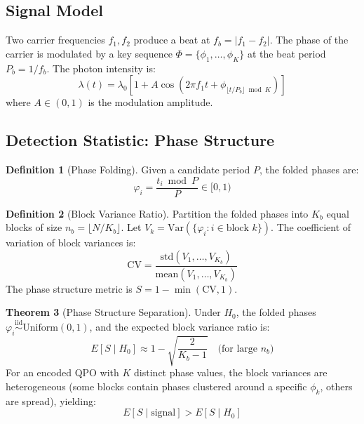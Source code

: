 \documentclass[11pt]{article}
\theoremstyle{definition}
\newtheorem{theorem}{Theorem}[section]
\newtheorem{definition}[theorem]{Definition}
\begin{document}
\subsection{Signal Model}

Two carrier frequencies $f_1, f_2$ produce a beat at $f_b = |f_1 - f_2|$. The phase of the carrier is modulated by a key sequence $\Phi = \{\phi_1, \ldots, \phi_K\}$ at the beat period $P_b = 1/f_b$. The photon intensity is:
\begin{equation}
\lambda(t) = \lambda_0 \left[1 + A \cos(2\pi f_1 t + \phi_{\lfloor t/P_b \rfloor \bmod K})\right]
\end{equation}
where $A \in (0, 1)$ is the modulation amplitude.

\subsection{Detection Statistic: Phase Structure}

\begin{definition}[Phase Folding]
Given a candidate period $P$, the folded phases are:
\begin{equation}
\varphi_i = \frac{t_i \bmod P}{P} \in [0, 1)
\end{equation}
\end{definition}

\begin{definition}[Block Variance Ratio]
Partition the folded phases into $K_b$ equal blocks of size $n_b = \lfloor N/K_b \rfloor$. Let $V_k = \mathrm{Var}(\{\varphi_i : i \in \text{block } k\})$. The coefficient of variation of block variances is:
\begin{equation}
\mathrm{CV} = \frac{\mathrm{std}(V_1, \ldots, V_{K_b})}{\mathrm{mean}(V_1, \ldots, V_{K_b})}
\end{equation}
The phase structure metric is $S = 1 - \min(\mathrm{CV}, 1)$.
\end{definition}

\begin{theorem}[Phase Structure Separation]
\label{thm:phase}
Under $H_0$, the folded phases $\varphi_i \stackrel{\text{iid}}{\sim} \mathrm{Uniform}(0,1)$, and the expected block variance ratio is:
\begin{equation}
E[S \mid H_0] \approx 1 - \sqrt{\frac{2}{K_b - 1}} \quad \text{(for large } n_b\text{)}
\end{equation}
For an encoded QPO with $K$ distinct phase values, the block variances are heterogeneous (some blocks contain phases clustered around a specific $\phi_k$, others are spread), yielding:
\begin{equation}
E[S \mid \text{signal}] > E[S \mid H_0]
\end{equation}
\end{theorem}
\end{document}
